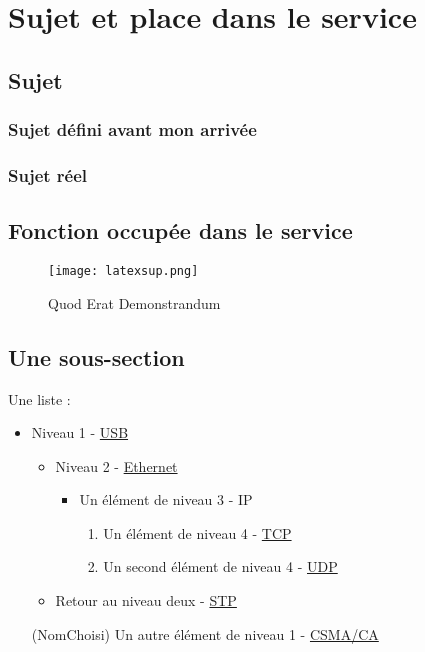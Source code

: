 \section{Sujet et place dans le service}
\subsection{Sujet}
\subsubsection{Sujet défini avant mon arrivée}
\subsubsection{Sujet réel}
\subsection{Fonction occupée dans le service}

\begin{figure}[H]
    \centering
    \texttt{[image: latexsup.png]}
    \caption{Quod Erat Demonstrandum}
\end{figure}

\FloatBarrier

\clearpage

\subsection{Une sous-section}

Une liste :
\begin{itemize} %
    \item Niveau 1 - \href{https://fr.wikipedia.org/wiki/USB}{USB}
    \begin{itemize}
        \item Niveau 2 - \href{https://fr.wikipedia.org/wiki/Ethernet}{Ethernet}
        \begin{itemize}
            \item Un élément de niveau 3 - IP
            \begin{enumerate} %
                \item Un élément de niveau 4 - \href{https://en.wikipedia.org/wiki/TCP}{TCP}
                \item Un second élément de niveau 4 - \href{https://en.wikipedia.org/wiki/UDP}{UDP}
            \end{enumerate}
        \end{itemize}
        \item Retour au niveau deux - \href{https://fr.wikipedia.org/wiki/Spanning_Tree_Protocol}{STP}
    \end{itemize}
    \item[(NomChoisi)] Un autre élément de niveau 1 - \href{https://fr.wikipedia.org/wiki/Carrier_Sense_Multiple_Access_with_Collision_Avoidance}{CSMA/CA}
\end{itemize}

